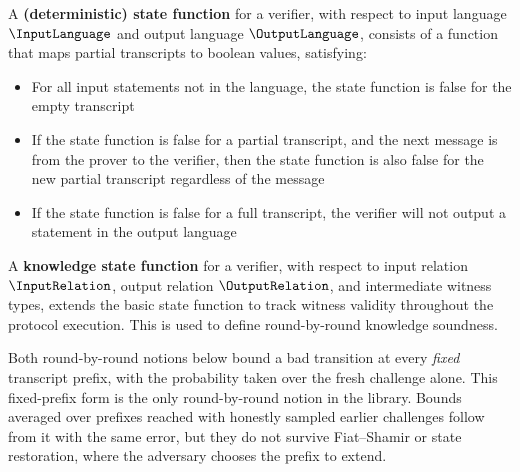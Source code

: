 \begin{definition}
    \label{def:state_function}
    A \textbf{(deterministic) state function} for a verifier, with respect to input language \(\InputLanguage\) and
    output language \(\OutputLanguage\), consists of a function that maps partial transcripts to boolean values, satisfying:
    \begin{itemize}
        \item For all input statements not in the language, the state function is false for the empty transcript
        \item If the state function is false for a partial transcript, and the next message is from the
        prover to the verifier, then the state function is also false for the new partial transcript
        regardless of the message
        \item If the state function is false for a full transcript, the verifier will not output a statement
        in the output language
    \end{itemize}
    \leanok
\end{definition}

\begin{definition}
    \label{def:knowledge_state_function}
    A \textbf{knowledge state function} for a verifier, with respect to input relation \(\InputRelation\), output
    relation \(\OutputRelation\), and intermediate witness types, extends the basic state function to track
    witness validity throughout the protocol execution. This is used to define round-by-round knowledge soundness.
    \leanok
\end{definition}

Both round-by-round notions below bound a bad transition at every \emph{fixed} transcript prefix,
with the probability taken over the fresh challenge alone. This fixed-prefix form is the only
round-by-round notion in the library. Bounds averaged over prefixes reached with honestly sampled
earlier challenges follow from it with the same error, but they do not survive Fiat--Shamir or
state restoration, where the adversary chooses the prefix to extend.

